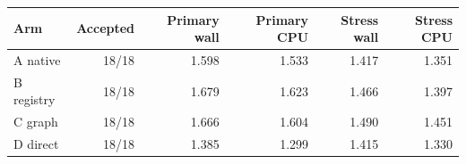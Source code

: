 \begin{tabularx}{\linewidth}{Yrrrrr}
\toprule Arm & Accepted & Primary wall & Primary CPU & Stress wall & Stress CPU \\
\midrule
A native & 18/18 & 1.598 & 1.533 & 1.417 & 1.351 \\
B registry & 18/18 & 1.679 & 1.623 & 1.466 & 1.397 \\
C graph & 18/18 & 1.666 & 1.604 & 1.490 & 1.451 \\
D direct & 18/18 & 1.385 & 1.299 & 1.415 & 1.330 \\
\bottomrule
\end{tabularx}
